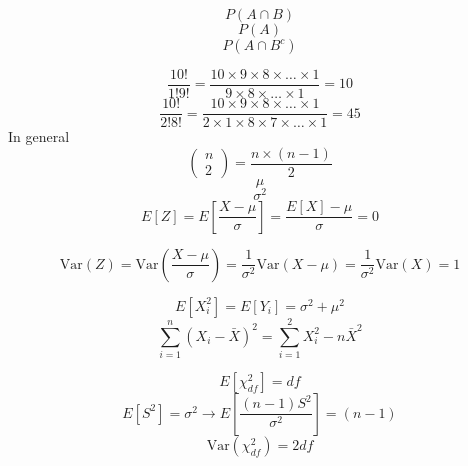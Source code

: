 \documentclass[aspectratio=169]{beamer}
\newcommand{\Var}{\mathrm{Var}}
\begin{document}
\begin{frame}
$$
P(A\cap B)
$$
$$
P(A)
$$
$$
P(A\cap B^c)
$$
\end{frame}

\begin{frame}
$$
\frac{10!}{1!9!} = \frac{10\times 9 \times 8 \times \ldots \times 1}{9 \times 8 \times \ldots \times 1} = 10
$$
$$
\frac{10!}{2!8!} = \frac{10\times 9 \times 8 \times \ldots \times 1}{2 \times 1 \times 8 \times 7 \times \ldots \times 1} = 45
$$
In general
$$
\left(
\begin{array}{c}
n \\ 2
\end{array}
\right)
= 
\frac{n \times (n - 1)}{2}
$$
$$
\mu 
$$
$$
\sigma^2
$$
$$
E[Z] = E\left[\frac{X - \mu}{\sigma} \right] = \frac{E[X] - \mu}{\sigma}  = 0
$$
\end{frame}

\begin{frame}
$$
\Var(Z) = \Var\left(\frac{X - \mu}{\sigma}\right) = \frac{1}{\sigma^2} \Var(X - \mu) = \frac{1}{\sigma^2} \Var(X) = 1
$$
\end{frame}

\begin{frame}
$$
E[X_i^2] = E[Y_i] = \sigma^2 + \mu^2
$$
$$
\sum_{i=1}^n (X_i - \bar X)^2 = \sum_{i=1}^2 X_i^2 - n \bar X ^ 2 
$$
\end{frame}

\begin{frame}
$$
E[\chi^2_{df}] = df
$$
$$
E[S^2] = \sigma^2
\rightarrow 
E\left[\frac{(n-1)S^2}{\sigma^2}\right] = (n-1)
$$
$$
\Var(\chi^2_{df}) = 2df
$$
\end{frame}
\end{document}
